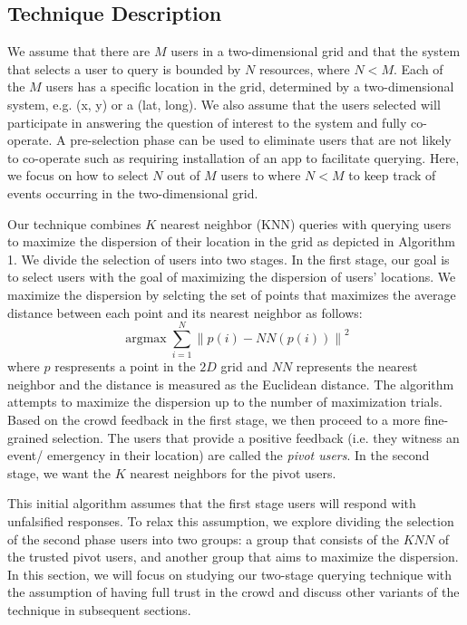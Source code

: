 \documentclass{acm_proc_article-sp}
\DeclareMathOperator*{\argmax}{argmax}
\newcommand{\norm}[1]{\left\lVert #1 \right\rVert}
\begin{document}
\subsection{Technique Description}
We assume that there are $M$ users in a two-dimensional grid and that the system that selects a user to query is bounded by $N$ resources, where $N < M$.  Each of the $M$ users has a specific location in the grid, determined by a two-dimensional system, e.g. (x, y) or a (lat, long). We also assume that the users selected will participate in answering the question of interest to the system and fully co-operate. A pre-selection phase can be used to eliminate users that are not likely to co-operate such as requiring installation of an app to facilitate querying. Here, we focus on how to select $N$ out of $M$ users to  where $N < M$ to keep track of events occurring in the two-dimensional grid.\par
Our technique combines $K$ nearest neighbor (KNN) queries with querying users to maximize the dispersion of their location in the grid as depicted in Algorithm 1. We divide the selection of users into two stages. In the first stage, our goal is to select users with the goal of maximizing the dispersion of users' locations. We maximize the dispersion by selcting the set of points that maximizes the average distance between each point and its nearest neighbor as follows:
\begin{equation}
\argmax \sum_{i=1}^{N} \norm{p(i) - NN(p(i))}^2
\end{equation}
where $p$ respresents a point in the $2D$ grid and $NN$ represents the nearest neighbor and the distance is measured as the Euclidean distance. The algorithm attempts to maximize the dispersion up to the number of maximization trials. 
Based on the crowd feedback in the first stage, we then proceed to a more fine-grained selection. The users that provide a positive feedback (i.e. they witness an event/ emergency in their location) are called the \textit{pivot users}. In the second stage, we want the $K$ nearest neighbors for the pivot users. \par
This initial algorithm assumes that the first stage users will respond with unfalsified responses. To relax this assumption, we explore dividing the selection of the second phase users into two groups: a group that consists of the $KNN$ of the trusted pivot users, and another group that aims to maximize the dispersion. In this section, we will focus on studying our two-stage querying technique with the assumption of having full trust in the crowd and discuss other variants of the technique in subsequent sections.\par
\end{document}

